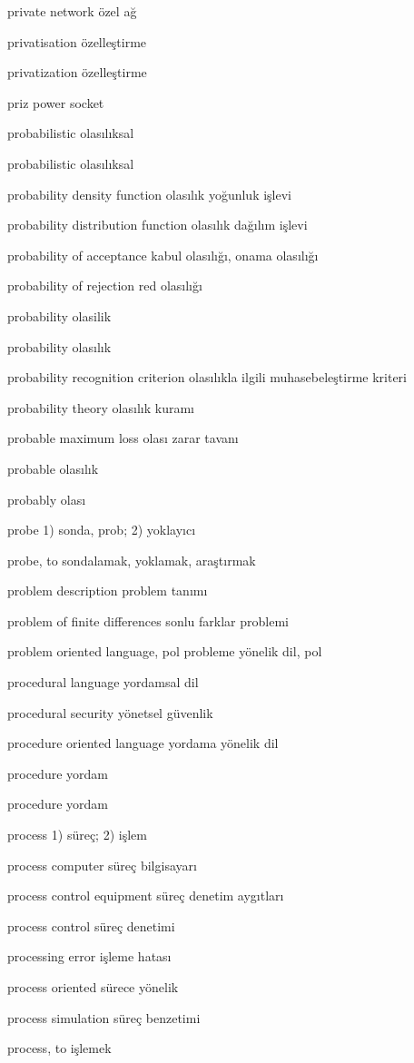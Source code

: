 \documentclass[12pt,fleqn]{article}\usepackage{../../common}
\begin{document}
private network özel ağ

privatisation özelleştirme

privatization özelleştirme

priz power socket

probabilistic olasılıksal

probabilistic olasılıksal

probability density function olasılık yoğunluk işlevi

probability distribution function olasılık dağılım işlevi

probability of acceptance kabul olasılığı, onama olasılığı

probability of rejection red olasılığı

probability olasilik

probability olasılık

probability recognition criterion olasılıkla ilgili muhasebeleştirme kriteri

probability theory olasılık kuramı

probable maximum loss olası zarar tavanı

probable olasılık

probably olası

probe 1) sonda, prob; 2) yoklayıcı

probe, to sondalamak, yoklamak, araştırmak

problem description problem tanımı

problem of finite differences sonlu farklar problemi

problem oriented language, pol probleme yönelik dil, pol

procedural language yordamsal dil

procedural security yönetsel güvenlik

procedure oriented language yordama yönelik dil

procedure yordam

procedure yordam

process 1) süreç; 2) işlem

process computer süreç bilgisayarı

process control equipment süreç denetim aygıtları

process control süreç denetimi

processing error işleme hatası

process oriented sürece yönelik

process simulation süreç benzetimi

process, to işlemek
\end{document}
